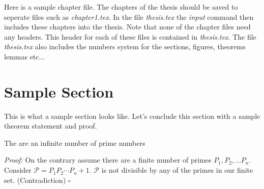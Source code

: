

	Here is a sample chapter file. The chapters of the thesis
	should be saved to seperate files such as
	\textit{chapter1.tex}. In the file \textit{thesis.tex} the
	\textit{input} command then includes these chapters into the
	thesis. Note that none of the chapter files need any headers.
	This header for each of these files is contained in
	\textit{thesis.tex}. The file \textit{thesis.tex} also
	includes the numbers system for the sections, figures,
	theorems lemmas etc...

\section{Sample Section}
\label{sample_section}

	This is what a sample section looks like. Let's conclude this
	section with a sample theorem statement and proof.

	\begin{theorem}
	\label{sample_theorem}
	The are an infinite number of prime numbers
	\end{theorem}

	\emph{Proof:} On the contrary assume there are a finite number
	of primes $P_1, P_2, ... P_n$. Consider $\mathcal{P} = P_1 P_2
	\cdots P_n+1$. $\mathcal{P}$ is not divisible by any of the
	primes in our finite set. (Contradiction) $\square$
  

